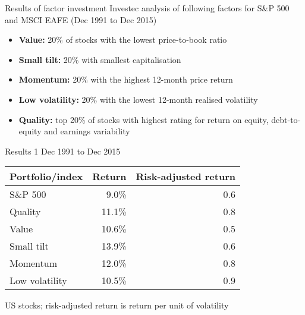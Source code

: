 \documentclass[14pt,xcolor=pdftex,dvipsnames,table]{beamer}\usepackage[]{graphicx}\usepackage[]{color}
\begin{document}
\begin{frame}{Results of factor investment}
Investec analysis of following factors for S\&P 500 and MSCI EAFE (Dec 1991 to Dec 2015)
\begin{itemize}[<+-| alert@+>]
\pause
\item \textbf{Value:} 20\% of stocks with the lowest price-to-book ratio
\item \textbf{Small tilt:} 20\% with smallest capitalisation
\item \textbf{Momentum:} 20\% with the highest 12-month price return
\item \textbf{Low volatility:} 20\% with the lowest 12-month realised volatility
\item \textbf{Quality:} top 20\% of stocks with highest rating for return on equity, debt-to-equity and earnings variability
\end{itemize}
\end{frame}

\begin{frame}{Results 1}
Dec 1991 to Dec 2015
\begin{table}
\begin{center}
\begin{tabular}{l r r }
\textbf{Portfolio/index} & \textbf{Return} & \textbf{Risk-adjusted return} \\
\hline
S\&P 500        & 9.0\% &  0.6\\
Quality         & 11.1\% & 0.8\\
Value           & 10.6\% & 0.5\\
Small tilt      & 13.9\% & 0.6\\
Momentum        & 12.0\% & 0.8\\
Low volatility &  10.5\% & 0.9\\
\end{tabular}
\end{center}
\end{table}
US stocks; risk-adjusted return is return per unit of volatility
\end{frame}
\end{document}
